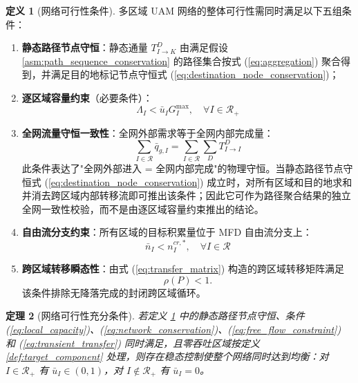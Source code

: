 \documentclass[a4paper,12pt]{article}
\theoremstyle{plain}
\newtheorem{theorem}{定理}[section]
\theoremstyle{definition}
\newtheorem{definition}[theorem]{定义}
\theoremstyle{remark}
\begin{document}
\begin{definition}[网络可行性条件]\label{def:network_feasibility}
多区域 UAM 网络的整体可行性需同时满足以下五组条件：
\begin{enumerate}
    \item \textbf{静态路径节点守恒}：静态通量 $T_{I\to K}^D$ 由满足假设 \ref{asm:path_sequence_conservation} 的路径集合按式 (\ref{eq:aggregation}) 聚合得到，并满足目的地标记节点守恒式 (\ref{eq:destination_node_conservation})；
    \item \textbf{逐区域容量约束}（必要条件）：
    \begin{equation}\label{eq:local_capacity}
        \Lambda_I < \bar u_I G_I^{\max}, \quad \forall I \in \mathcal{R}_+
    \end{equation}
    \item \textbf{全网流量守恒一致性}：全网外部需求等于全网内部完成量：
    \begin{equation}\label{eq:network_conservation}
        \sum_{I \in \mathcal{R}} \bar{q}_{g,I} = \sum_{I \in \mathcal{R}} \sum_D T_{I \to I}^D
    \end{equation}
    此条件表达了"全网外部进入 = 全网内部完成"的物理守恒。当静态路径节点守恒式 (\ref{eq:destination_node_conservation}) 成立时，对所有区域和目的地求和并消去跨区域内部转移流即可推出该条件；因此它可作为路径聚合结果的独立全网一致性校验，而不是由逐区域容量约束推出的结论。
    \item \textbf{自由流分支约束}：所有区域的目标积累量位于 MFD 自由流分支上：
    \begin{equation}\label{eq:free_flow_constraint}
        \bar{n}_I < n_I^{cr,*}, \quad \forall I \in \mathcal{R}
    \end{equation}
    \item \textbf{跨区域转移瞬态性}：由式 (\ref{eq:transfer_matrix}) 构造的跨区域转移矩阵满足
    \begin{equation}\label{eq:transient_transfer}
        \rho(P)<1 .
    \end{equation}
    该条件排除无降落完成的封闭跨区域循环。
\end{enumerate}
\end{definition}

\begin{theorem}[网络可行性充分条件]\label{thm:network_feasibility}
若定义 \ref{def:network_feasibility} 中的静态路径节点守恒、条件 (\ref{eq:local_capacity})、(\ref{eq:network_conservation})、(\ref{eq:free_flow_constraint}) 和 (\ref{eq:transient_transfer}) 同时满足，且零吞吐区域按定义 \ref{def:target_component} 处理，则存在稳态控制使整个网络同时达到均衡：对 $I\in\mathcal R_+$ 有 $\bar{u}_I \in (0,1)$，对 $I\notin\mathcal R_+$ 有 $\bar u_I=0$。
\end{theorem}
\end{document}
